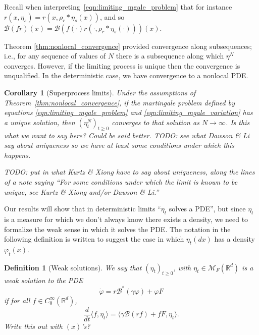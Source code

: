 \documentclass[12pt]{article}
\newtheorem{corollary}[theorem]{Corollary}
\newtheorem{definition}[theorem]{Definition}
\newcommand{\IR}{\mathbb R}
\newcommand{\DG}{\mathcal{B}}  %
\newcommand{\kernel}{\rho}  %
\newcommand{\smooth}[1]{\kernel_{#1} \! * \!}  %
\newcommand{\measures}{\mathcal{M}_F(\IR^d)} %
\newcommand{\comment}[1]{{\color{blue} \it #1}}
\begin{document}
Recall when interpreting~\eqref{eqn:limiting_mgale_problem}
that for instance $r(x, \eta_s) = r(x, \smooth{r} \eta_s(x))$,
and so $\DG(fr)(x) = \DG(f(\cdot) r(\cdot, \smooth{r} \eta_s(\cdot)))(x)$.

Theorem \ref{thm:nonlocal_convergence} provided convergence along subsequences;
i.e., for any sequence of values of $N$
there is a subsequence along which $\eta^N$ converges.
However, if the limiting process is unique then the convergence is unqualified.
In the deterministic case, we have convergence to a nonlocal PDE.

\begin{corollary}[Superprocess limits] \label{cor:superprocess_uniqueness}
    Under the assumptions of Theorem~\ref{thm:nonlocal_convergence},
    if the martingale problem
    defined by equations \eqref{eqn:limiting_mgale_problem} and \eqref{eqn:limiting_mgale_variation}
    has a unique solution,
    then $(\eta^N_t)_{t \ge 0}$ converges to that solution
    as $N \to \infty$.
    \comment{
        Is this what we want to say here? Could be said better.
        TODO: see what Dawson \& Li say about uniqueness
        so we have at least some conditions under which this happens.
    }
\end{corollary}

\comment{
    TODO: put in what Kurtz \& Xiong have to say about uniqueness,
along the lines of a note saying ``For some conditions under which the limit is known to be unique,
see Kurtz \& Xiong and/or Dawson \& Li.''
}

Our results will show that in deterministic limits ``$\eta_t$ solves a PDE'',
but since $\eta_t$ is a measure for which we don't always know there exists a density,
we need to formalize the weak sense in which it solves the PDE.
The notation in the following definition
is written to suggest the case in which $\eta_t(dx)$ has a density $\varphi_t(x)$.

\begin{definition}[Weak solutions]
    \label{defn:weak_solutions}
    We say that $(\eta_t)_{t \ge 0}$, with $\eta_t \in \measures$
    is a \emph{weak solution} to the PDE
    $$
        \dot \varphi = r \DG^*(\gamma \varphi) + \varphi F
    $$
    if for all $f \in C_0^\infty(\IR^d)$,
    $$
        \frac{d}{dt} \langle f, \eta_t \rangle
        =
        \langle
            \gamma \DG(rf) + f F,
            \eta_t
        \rangle .
    $$
    \comment{Write this out with $(x)$'s?}
\end{definition}
\end{document}
